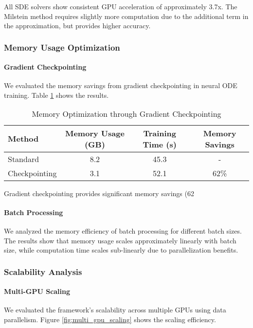 All SDE solvers show consistent GPU acceleration of approximately 3.7x. The Milstein method requires slightly more computation due to the additional term in the approximation, but provides higher accuracy.

\subsubsection{Memory Usage Optimization}

\paragraph{Gradient Checkpointing}
We evaluated the memory savings from gradient checkpointing in neural ODE training. Table \ref{tab:memory_optimization} shows the results.

\begin{table}[h]
\centering
\caption{Memory Optimization through Gradient Checkpointing}
\label{tab:memory_optimization}
\begin{tabular}{lccc}
\toprule
Method & Memory Usage (GB) & Training Time (s) & Memory Savings \\
\midrule
Standard & 8.2 & 45.3 & - \\
Checkpointing & 3.1 & 52.1 & 62\% \\
\bottomrule
\end{tabular}
\end{table}

Gradient checkpointing provides significant memory savings (62%

\paragraph{Batch Processing}
We analyzed the memory efficiency of batch processing for different batch sizes. The results show that memory usage scales approximately linearly with batch size, while computation time scales sub-linearly due to parallelization benefits.

\subsubsection{Scalability Analysis}

\paragraph{Multi-GPU Scaling}
We evaluated the framework's scalability across multiple GPUs using data parallelism. Figure \ref{fig:multi_gpu_scaling} shows the scaling efficiency.

